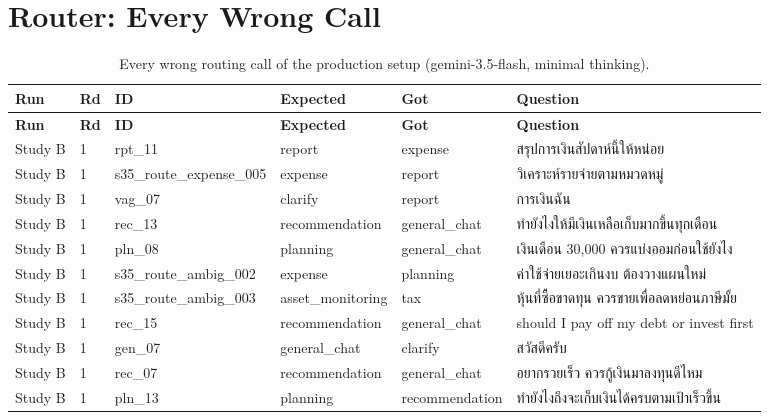 \documentclass[11pt,a4paper]{article}
\begin{document}
\section{Router: Every Wrong Call}
{\scriptsize
\begin{longtable}{llp{2.5cm}p{2.1cm}p{2.5cm}p{5.4cm}}
\caption{Every wrong routing call of the production setup (gemini-3.5-flash, minimal thinking).}\label{tab:app-b-wrong}\\
\toprule
\textbf{Run} & \textbf{Rd} & \textbf{ID} & \textbf{Expected} & \textbf{Got} & \textbf{Question} \\
\midrule
\endfirsthead
\toprule
\textbf{Run} & \textbf{Rd} & \textbf{ID} & \textbf{Expected} & \textbf{Got} & \textbf{Question} \\
\midrule
\endhead
\bottomrule
\endfoot
Study B & 1 & rpt\_\allowbreak{}11 & report & expense & {\thaifont สรุปการเงินสัปดาห์นี้ให้หน่อย} \\
Study B & 1 & s35\_\allowbreak{}route\_\allowbreak{}expense\_\allowbreak{}005 & expense & report & {\thaifont วิเคราะห์รายจ่ายตามหมวดหมู่} \\
Study B & 1 & vag\_\allowbreak{}07 & clarify & report & {\thaifont การเงินฉัน} \\
Study B & 1 & rec\_\allowbreak{}13 & recommendation & general\_\allowbreak{}chat & {\thaifont ทำยังไงให้มีเงินเหลือเก็บมากขึ้นทุกเดือน} \\
Study B & 1 & pln\_\allowbreak{}08 & planning & general\_\allowbreak{}chat & {\thaifont เงินเดือน }30,000 {\thaifont ควรแบ่งออมก่อนใช้ยังไง} \\
Study B & 1 & s35\_\allowbreak{}route\_\allowbreak{}ambig\_\allowbreak{}002 & expense & planning & {\thaifont ค่าใช้จ่ายเยอะเกินงบ ต้องวางแผนใหม่} \\
Study B & 1 & s35\_\allowbreak{}route\_\allowbreak{}ambig\_\allowbreak{}003 & asset\_\allowbreak{}monitoring & tax & {\thaifont หุ้นที่ซื้อขาดทุน ควรขายเพื่อลดหย่อนภาษีมั้ย} \\
Study B & 1 & rec\_\allowbreak{}15 & recommendation & general\_\allowbreak{}chat & should I pay off my debt or invest first \\
Study B & 1 & gen\_\allowbreak{}07 & general\_\allowbreak{}chat & clarify & {\thaifont สวัสดีครับ} \\
Study B & 1 & rec\_\allowbreak{}07 & recommendation & general\_\allowbreak{}chat & {\thaifont อยากรวยเร็ว ควรกู้เงินมาลงทุนดีไหม} \\
Study B & 1 & pln\_\allowbreak{}13 & planning & recommendation & {\thaifont ทำยังไงถึงจะเก็บเงินได้ครบตามเป้าเร็วขึ้น} \\

\end{longtable}}
\end{document}
